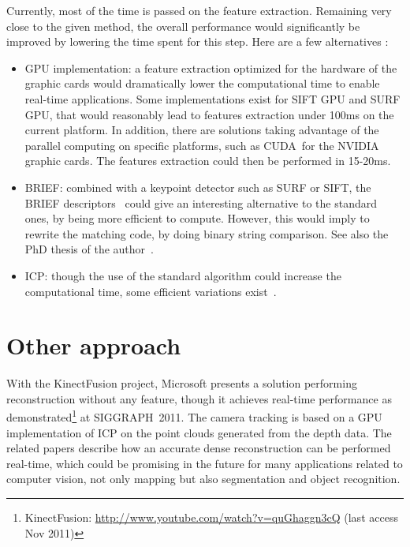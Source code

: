 Currently, most of the time is passed on the feature extraction. Remaining very close to the given method, the overall performance would significantly be improved by lowering the time spent for this step. Here are a few alternatives :
\begin{itemize}
\item GPU implementation: a feature extraction optimized for the hardware of the graphic cards would dramatically lower the computational time to enable real-time applications. Some implementations exist for SIFT GPU and SURF GPU, that would reasonably lead to features extraction under 100ms on the current platform. In addition, there are solutions taking advantage of the parallel computing on specific platforms, such as CUDA~\texttrademark for the NVIDIA graphic cards. The features extraction could then be performed in 15-20ms.
\item BRIEF: combined with a keypoint detector such as \gls{SURF} or \gls{SIFT}, the \gls{BRIEF} descriptors~\cite{Calonder10-brief} could give an interesting alternative to the standard ones, by being more efficient to compute. However, this would imply to rewrite the matching code, by doing binary string comparison. See also the PhD thesis of the author~\cite{Calonder10_PhD}.
\item ICP: though the use of the standard algorithm could increase the computational time, some efficient variations exist~\cite{Rusinkiewicz_2001}. 
\end{itemize}

\section{Other approach}

With the KinectFusion project, Microsoft presents a solution performing reconstruction without any feature, though it achieves real-time performance as demonstrated\footnote{KinectFusion: \url{http://www.youtube.com/watch?v=quGhaggn3cQ} (last access Nov 2011)} at SIGGRAPH~2011. The camera tracking is based on a GPU implementation of \gls{ICP} on the point clouds generated from the depth data. The related papers \cite{Izadi_2011_SIGGRAPH} \cite{Newcombe_2011_ISMAR} describe how an accurate dense reconstruction can be performed real-time, which could be promising in the future for many applications related to computer vision, not only mapping but also segmentation and object recognition.
